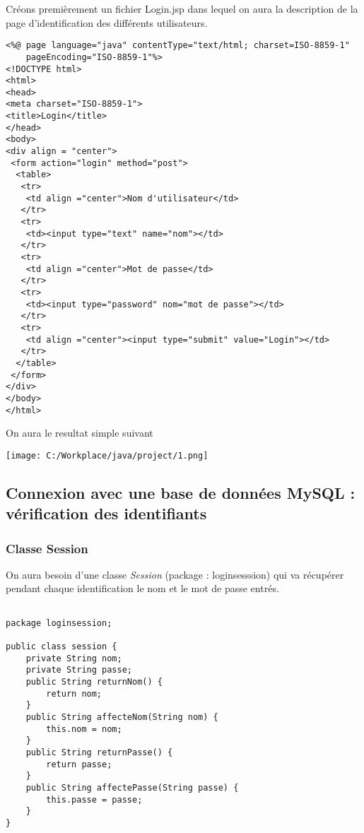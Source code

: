 \documentclass[12]{article}
\begin{document}
Créons premièrement un fichier Login.jsp dans lequel on aura la description de la page d'identification des différents utilisateurs.

\lstset{language=XML}
\begin{small}
\begin{lstlisting}
<%@ page language="java" contentType="text/html; charset=ISO-8859-1"
	pageEncoding="ISO-8859-1"%>
<!DOCTYPE html>
<html>
<head>
<meta charset="ISO-8859-1">
<title>Login</title>
</head>
<body>
<div align = "center"> 
 <form action="login" method="post">
  <table>
   <tr>
    <td align ="center">Nom d'utilisateur</td>
   </tr>
   <tr>
    <td><input type="text" name="nom"></td>
   </tr>
   <tr>
    <td align ="center">Mot de passe</td>
   </tr>
   <tr>
    <td><input type="password" nom="mot de passe"></td>
   </tr>
   <tr>
    <td align ="center"><input type="submit" value="Login"></td>
   </tr>
  </table>
 </form>
</div>
</body>
</html>
\end{lstlisting}
\end{small}
\newpage
On aura le resultat simple suivant\\

\begin{center}
\texttt{[image: C:/Workplace/java/project/1.png]}
\end{center}




\subsection{Connexion avec une base de données MySQL : vérification des identifiants}


\subsubsection{Classe Session}
On aura besoin d'une classe \textit{Session} (package : loginsesssion) qui va récupérer pendant chaque identification le nom et le mot de passe entrés.\\

\lstset{language=java}
\begin{lstlisting}

package loginsession;

public class session {
	private String nom;
	private String passe;
	public String returnNom() {
		return nom;
	}
	public String affecteNom(String nom) {
		this.nom = nom;
	}
	public String returnPasse() {
		return passe;
	}
	public String affectePasse(String passe) {
		this.passe = passe;
	}
}

\end{lstlisting}
\end{document}
